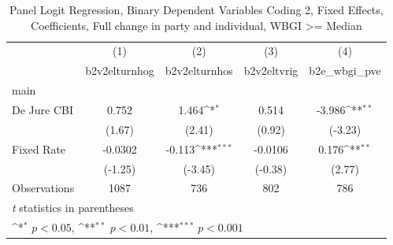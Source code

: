 \begin{table}[htbp]\centering
\def\sym#1{\ifmmode^{#1}\else\(^{#1}\)\fi}
\caption{Panel Logit Regression, Binary Dependent Variables Coding 2, Fixed Effects, Coefficients, Full change in party and individual, WBGI >= Median \label{logitFEMultInd2DJ}}
\begin{tabular}{l*{4}{c}}
\toprule
                                        &\multicolumn{1}{c}{(1)}&\multicolumn{1}{c}{(2)}&\multicolumn{1}{c}{(3)}&\multicolumn{1}{c}{(4)}\\
                                        &\multicolumn{1}{c}{b2v2elturnhog}&\multicolumn{1}{c}{b2v2elturnhos}&\multicolumn{1}{c}{b2v2eltvrig}&\multicolumn{1}{c}{b2e\_wbgi\_pve}\\
\midrule
main                                    &                  &                  &                  &                  \\
De Jure CBI                             &    0.752         &    1.464\sym{*}  &    0.514         &   -3.986\sym{**} \\
                                        &   (1.67)         &   (2.41)         &   (0.92)         &  (-3.23)         \\
\addlinespace
Fixed Rate                              &  -0.0302         &   -0.113\sym{***}&  -0.0106         &    0.176\sym{**} \\
                                        &  (-1.25)         &  (-3.45)         &  (-0.38)         &   (2.77)         \\
\midrule
Observations                            &     1087         &      736         &      802         &      786         \\
\bottomrule
\multicolumn{5}{l}{\footnotesize \textit{t} statistics in parentheses}\\
\multicolumn{5}{l}{\footnotesize \sym{*} \(p<0.05\), \sym{**} \(p<0.01\), \sym{***} \(p<0.001\)}\\
\end{tabular}
\end{table}
